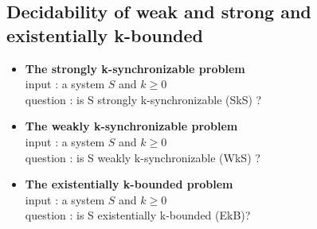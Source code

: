 \documentclass[a4paper,UKenglish,cleveref, autoref, thm-restate]{lipics-v2021}
\begin{document}
\subsection{Decidability of weak and strong  and existentially k-bounded }\label{section:decidability_with_k}




\begin{itemize}
	\item {\bf The strongly k-synchronizable problem} \\
	input : a system $S$ and $k \geq 0$ \\
	question : is S strongly k-synchronizable (SkS) ?
	\item {\bf The weakly k-synchronizable problem} \\
	input : a system $S$ and $k \geq 0$ \\
	question : is S weakly k-synchronizable (WkS) ?
	\item {\bf The existentially k-bounded problem} \\
	input : a system $S$ and $k \geq 0$ \\
	question : is S existentially k-bounded (EkB)?
\end{itemize}
\fi

\end{document}
